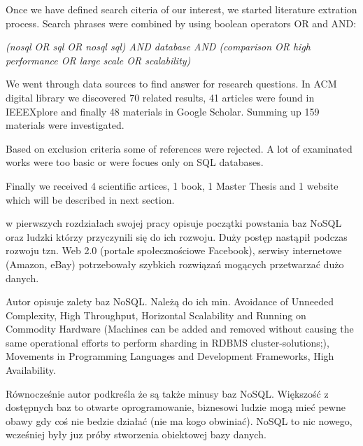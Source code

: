 \documentclass[times, 10pt,twocolumn]{article}
\begin{document}

Once we have defined search citeria of our interest, we started literature extration process.
Search phrases were combined by using boolean operators OR and AND:

\emph{(nosql OR sql OR nosql sql) AND database AND (comparison OR high performance OR large scale OR scalability)}
  
We went through data sources to find answer for research questions.
In ACM digital library we discovered 70 related results, 41 articles were found in IEEEXplore and finally 48 materials in Google Scholar.
Summing up 159 materials were investigated. 

Based on exclusion criteria some of references were rejected. A lot of examinated works were too basic or were focues only on SQL databases.

Finally we received 4 scientific artices, 1 book, 1 Master Thesis and 1 website which will be described in next section.

 

\cite{strauch} w pierwszych rozdziałach swojej pracy opisuje początki powstania baz NoSQL oraz ludzki którzy
przyczynili się do ich rozwoju. Duży postęp nastąpił podczas rozwoju tzn. Web 2.0 (portale społecznościowe Facebook), serwisy
internetowe (Amazon, eBay) potrzebowały szybkich rozwiązań mogących przetwarzać dużo danych.

Autor opisuje zalety baz NoSQL. Należą do ich min. Avoidance of Unneeded Complexity, High Throughput,
Horizontal Scalability and Running on Commodity Hardware (Machines can be added and removed without causing the same operational efforts to perform sharding in RDBMS cluster-solutions;),
Movements in Programming Languages and Development Frameworks, High Availability.

Równocześnie autor podkreśla że są także minusy baz NoSQL. Większość z dostępnych baz to otwarte oprogramowanie, biznesowi 
ludzie mogą mieć pewne obawy gdy coś nie bedzie działać (nie ma kogo obwiniać). 
NoSQL to nic nowego, wcześniej były juz próby stworzenia obiektowej bazy danych.
\end{document}

